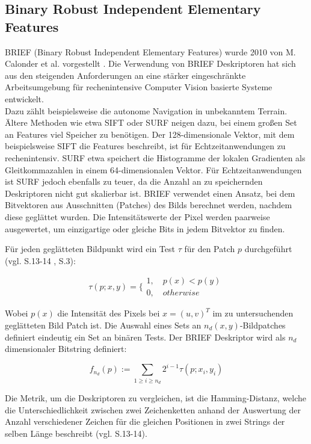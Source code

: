 \subsection{Binary Robust Independent Elementary Features}
BRIEF (Binary Robust Independent Elementary Features) wurde 2010 von M. Calonder et al. vorgestellt \cite{brief}. Die Verwendung von BRIEF Deskriptoren hat sich aus den steigenden Anforderungen an eine stärker eingeschränkte Arbeitsumgebung für rechenintensive Computer Vision basierte Systeme entwickelt. \\ Dazu zählt beispielsweise die autonome Navigation in unbekanntem Terrain. Ältere Methoden wie etwa SIFT oder SURF neigen dazu, bei einem großen Set an Features viel Speicher zu benötigen. Der 128-dimensionale Vektor, mit dem beispielsweise SIFT die Features beschreibt, ist für Echtzeitanwendungen zu rechenintensiv. SURF etwa speichert die Histogramme der lokalen Gradienten als Gleitkommazahlen in einem 64-dimensionalen Vektor. Für Echtzeitanwendungen ist SURF jedoch ebenfalls zu teuer, da die Anzahl an zu speichernden Deskriptoren nicht gut skalierbar ist. BRIEF verwendet einen Ansatz, bei dem Bitvektoren aus Ausschnitten (Patches) des Bilds berechnet werden, nachdem diese geglättet wurden. Die Intensitätswerte der Pixel werden paarweise ausgewertet, um einzigartige oder gleiche Bits in jedem Bitvektor zu finden. 

Für jeden geglätteten Bildpunkt wird ein Test $\tau$ für den Patch $p$ durchgeführt (vgl. \cite{orb_slam} S.13-14 , \cite{brief} S.3):

\begin{equation}
\tau(p;x,y)= \biggl\{ \begin{array}{ll}
         1, \quad p(x)<p(y)\\
        0, \quad otherwise\end{array}
\end{equation}

Wobei $p(x)$ die Intensität des Pixels bei $x=(u,v)^T$ im zu untersuchenden geglätteten Bild Patch ist. Die Auswahl eines Sets an $n_d (x,y)$-Bildpatches definiert eindeutig ein Set an binären Tests. Der BRIEF Deskriptor wird als $n_d$ dimensionaler Bitstring definiert:

\begin{equation}
f_{n_d}(p):= \sum_{1\geq i \geq n_d} 2^{i-1} \tau (p;x_i,y_i)
\end{equation}

Die Metrik, um die Deskriptoren zu vergleichen, ist die Hamming-Distanz, welche die Unterschiedlichkeit zwischen zwei Zeichenketten anhand der Auswertung der Anzahl verschiedener Zeichen für die gleichen Positionen in zwei Strings der selben Länge beschreibt (vgl. \cite{orb_slam} S.13-14).

